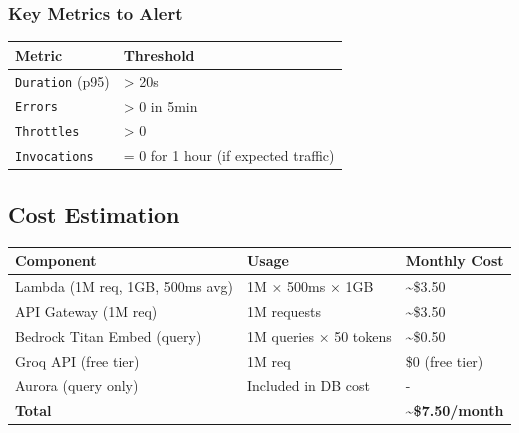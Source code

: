 \begin{Shaded}
\begin{Highlighting}[]
\end{Highlighting}
\end{Shaded}

\hypertarget{key-metrics-to-alert}{%
\subsubsection{Key Metrics to Alert}}

\begingroup
\small
\setlength{\tabcolsep}{3pt}
\renewcommand{\arraystretch}{1.15}
\begin{longtable}[]{@{}ll@{}}
\toprule\noalign{}
Metric & Threshold \\
\midrule\noalign{}
\endhead
\bottomrule\noalign{}
\endlastfoot
\texttt{Duration} (p95) & \textgreater{} 20s \\
\texttt{Errors} & \textgreater{} 0 in 5min \\
\texttt{Throttles} & \textgreater{} 0 \\
\texttt{Invocations} & = 0 for 1 hour (if expected traffic) \\
\end{longtable}
\endgroup

\hypertarget{cost-estimation}{%
\subsection{Cost Estimation}}

\begingroup
\small
\setlength{\tabcolsep}{3pt}
\renewcommand{\arraystretch}{1.15}
\begin{longtable}[]{@{}lll@{}}
\toprule\noalign{}
Component & Usage & Monthly Cost \\
\midrule\noalign{}
\endhead
\bottomrule\noalign{}
\endlastfoot
Lambda (1M req, 1GB, 500ms avg) & 1M × 500ms × 1GB &
\textasciitilde\$3.50 \\
API Gateway (1M req) & 1M requests & \textasciitilde\$3.50 \\
Bedrock Titan Embed (query) & 1M queries × 50 tokens &
\textasciitilde\$0.50 \\
Groq API (free tier) & 1M req & \$0 (free tier) \\
Aurora (query only) & Included in DB cost & - \\
\textbf{Total} & & \textbf{\textasciitilde\$7.50/month} \\
\end{longtable}
\endgroup


